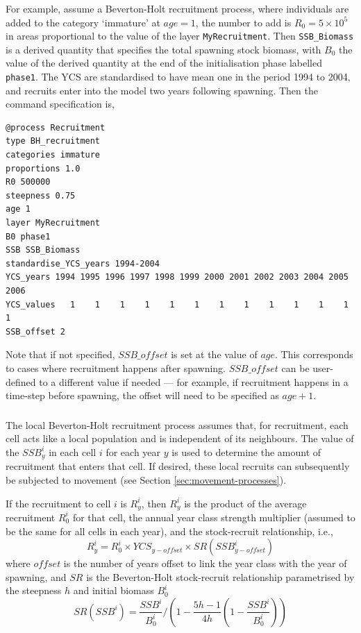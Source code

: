 For example, assume a Beverton-Holt recruitment process, where individuals are added to the category `immature' at $age=1$, the number to add is $R_0=5 \times 10^5$ in areas proportional to the value of the layer \texttt{MyRecruitment}. Then \texttt{SSB\_Biomass} is a derived quantity that specifies the total spawning stock biomass, with $B_0$ the value of the derived quantity at the end of the initialisation phase labelled \texttt{phase1}. The YCS are standardised to have mean one in the period 1994 to 2004, and recruits enter into the model two years following spawning. Then the command specification is,
{\small{\begin{verbatim}
@process Recruitment
type BH_recruitment
categories immature
proportions 1.0
R0 500000
steepness 0.75
age 1
layer MyRecruitment
B0 phase1
SSB SSB_Biomass
standardise_YCS_years 1994-2004
YCS_years 1994 1995 1996 1997 1998 1999 2000 2001 2002 2003 2004 2005 2006
YCS_values   1    1    1    1    1    1    1    1    1    1    1    1    1
SSB_offset 2
\end{verbatim}}}

Note that if not specified, $SSB\_offset$ is set at the value of $age$. This corresponds to cases where recruitment happens after spawning. $SSB\_offset$ can be user-defined to a different value if needed --- for example, if recruitment happens in a time-step before spawning, the offset will need to be specified as $age + 1$.

\subsubsection*{}

The local Beverton-Holt recruitment process assumes that, for recruitment, each cell acts like a local population and is independent of its neighbours. The value of the $SSB_y^i$ in each cell $i$ for each year $y$ is used to determine the amount of recruitment that enters that cell. If desired, these local recruits can subsequently be subjected to movement (see Section \ref{sec:movement-processes}).

If the recruitment to cell $i$ is $R_y^i$, then $R_y^i$ is the product of the average recruitment $R_0^i$ for that cell, the annual year class strength multiplier (assumed to be the same for all cells in each year), and the stock-recruit relationship, i.e., 
\begin{equation}
  R_y^i = R_0^i \times YCS_{y-offset} \times SR(SSB_{y-offset}^i)
\end{equation}
where $offset$ is the number of years offset to link the year class with the year of spawning, and $SR$ is the Beverton-Holt stock-recruit relationship parametrised by the steepness $h$ and initial biomass $B_0^i$
\begin{equation}
SR(SSB^i) = \frac{SSB^i}{B_0^i} / \left( 1-\frac{5h-1}{4h} \left( 1-\frac{SSB^i}{B_0^i} \right) \right)
\end{equation}

